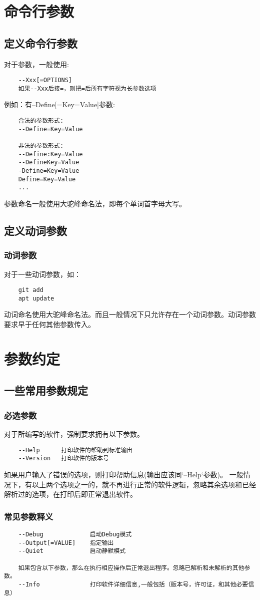 \chapter{命令行参数}
\section{定义命令行参数}

对于参数，一般使用:
\begin{lstlisting}
	--Xxx[=OPTIONS]
	如果--Xxx后接=，则把=后所有字符视为长参数选项	
\end{lstlisting}

例如：有--Define[=Key=Value]参数:
\begin{lstlisting}
	合法的参数形式:
	--Define=Key=Value
	
	非法的参数形式:
	--Define:Key=Value
	--DefineKey=Value
	-Define=Key=Value
	Define=Key=Value
	...
\end{lstlisting}
参数命名一般使用大驼峰命名法，即每个单词首字母大写。



\section{定义动词参数}
\subsection{动词参数}
对于一些动词参数，如：
\begin{lstlisting}
	git add
	apt update
\end{lstlisting}
动词命名使用大驼峰命名法。而且一般情况下只允许存在一个动词参数。动词参数要求早于任何其他参数传入。


\chapter{参数约定}

\section{一些常用参数规定}

\subsection{必选参数}

对于所编写的软件，强制要求拥有以下参数。
\label{_PARAM_HELP_RULE_}
\begin{lstlisting}
	--Help 		打印软件的帮助到标准输出
	--Version 	打印软件的版本号
\end{lstlisting}
如果用户输入了错误的选项，则打印帮助信息(输出应该同`--Help`参数)。
一般情况下，有以上两个选项之一的，就不再进行正常的软件逻辑，忽略其余选项和已经解析过的选项，在打印后即正常退出软件。


\subsection{常见参数释义}
\begin{lstlisting}
	--Debug				启动Debug模式
	--Output[=VALUE]	指定输出
	--Quiet				启动静默模式
	
	如果包含以下参数，那么在执行相应操作后正常退出程序。忽略已解析和未解析的其他参数。
	--Info 				打印软件详细信息,一般包括（版本号，许可证，和其他必要信息）
\end{lstlisting}

